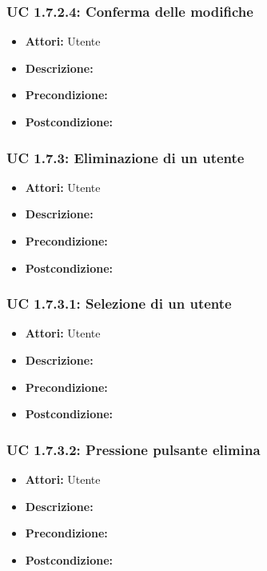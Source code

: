 \subsubsection{UC 1.7.2.4: Conferma delle modifiche}

\begin{itemize}
\item \textbf{Attori:} Utente
\item \textbf{Descrizione:} 
\item \textbf{Precondizione:} 
\item \textbf{Postcondizione:} 
\end{itemize}

\subsubsection{UC 1.7.3: Eliminazione di un utente}

\begin{itemize}
\item \textbf{Attori:} Utente
\item \textbf{Descrizione:} 
\item \textbf{Precondizione:} 
\item \textbf{Postcondizione:} 
\end{itemize}

\subsubsection{UC 1.7.3.1: Selezione di un utente}

\begin{itemize}
\item \textbf{Attori:} Utente
\item \textbf{Descrizione:} 
\item \textbf{Precondizione:} 
\item \textbf{Postcondizione:} 
\end{itemize}

\subsubsection{UC 1.7.3.2: Pressione pulsante elimina}

\begin{itemize}
\item \textbf{Attori:} Utente
\item \textbf{Descrizione:} 
\item \textbf{Precondizione:} 
\item \textbf{Postcondizione:} 
\end{itemize}

